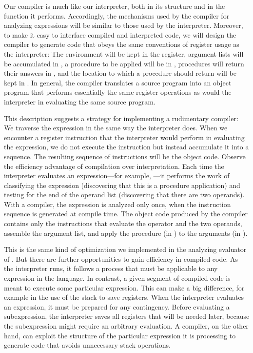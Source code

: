 Our compiler is much like our interpreter, both in its structure and in the
function it performs.  Accordingly, the mechanisms used by the compiler for
analyzing expressions will be similar to those used by the interpreter.
Moreover, to make it easy to interface compiled and interpreted code, we will
design the compiler to generate code that obeys the same conventions of
register usage as the interpreter: The environment will be kept in the
 register, argument lists will be accumulated in , a
procedure to be applied will be in , procedures will return their
answers in , and the location to which a procedure should return will
be kept in .  In general, the compiler translates a source
program into an object program that performs essentially the same register
operations as would the interpreter in evaluating the same source program.

This description suggests a strategy for implementing a rudimentary compiler:
We traverse the expression in the same way the interpreter does.  When we
encounter a register instruction that the interpreter would perform in
evaluating the expression, we do not execute the instruction but instead
accumulate it into a sequence.  The resulting sequence of instructions will be
the object code.  Observe the efficiency advantage of compilation over
interpretation.  Each time the interpreter evaluates an expression---for
example, ---it performs the work of classifying the expression
(discovering that this is a procedure application) and testing for the end of
the operand list (discovering that there are two operands).  With a compiler,
the expression is analyzed only once, when the instruction sequence is
generated at compile time.  The object code produced by the compiler contains
only the instructions that evaluate the operator and the two operands, assemble
the argument list, and apply the procedure (in ) to the arguments
(in ).

This is the same kind of optimization we implemented in the analyzing evaluator
of .  But there are further opportunities to gain efficiency
in compiled code.  As the interpreter runs, it follows a process that must be
applicable to any expression in the language.  In contrast, a given segment of
compiled code is meant to execute some particular expression.  This can make a
big difference, for example in the use of the stack to save registers.  When
the interpreter evaluates an expression, it must be prepared for any
contingency.  Before evaluating a subexpression, the interpreter saves all
registers that will be needed later, because the subexpression might require an
arbitrary evaluation.  A compiler, on the other hand, can exploit the structure
of the particular expression it is processing to generate code that avoids
unnecessary stack operations.

